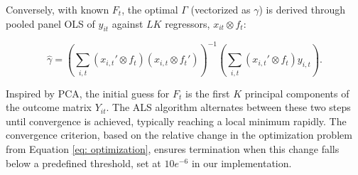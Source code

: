 \documentclass[12pt]{article}
\begin{document}
Conversely, with known $F_{t}$, the optimal $\Gamma$ (vectorized as $\gamma$) is derived through pooled panel OLS of $y_{it}$ against $LK$ regressors, $x_{it} \otimes f_t$:

\begin{equation*}
\hat{\gamma} = \left( \sum_{i,t} (x_{i,t}' \otimes f_t) (x_{i,t} \otimes f_t') \right)^{-1} \left( \sum_{i,t} (x_{i,t}' \otimes f_t) y_{i,t} \right).
\end{equation*}

Inspired by PCA, the initial guess for $F_t$ is the first $K$ principal components of the outcome matrix $Y_{it}$. The ALS algorithm alternates between these two steps until convergence is achieved, typically reaching a local minimum rapidly. The convergence criterion, based on the relative change in the optimization problem from Equation \ref{eq: optimization}, ensures termination when this change falls below a predefined threshold, set at $10e^{-6}$ in our implementation.
\end{document}
